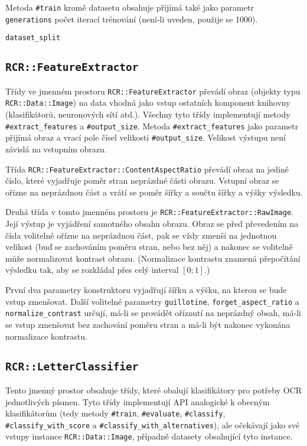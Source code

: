\documentclass[a4paper]{article}
\begin{document}
Metoda \texttt{\#train} kromě datasetu obsahuje přijímá také jako parametr
\texttt{generations} počet iterací trénování (není-li uveden, použije se 1000).

\texttt{dataset\_split}

\subsection{\texttt{RCR::FeatureExtractor}}
Třídy ve jmenném prostoru \texttt{RCR::FeatureExtractor} převádí obraz (objekty
typu \texttt{RCR::Data::Image}) na data vhodná jako vstup ostatních komponent
knihovny (klasifikátorů, neuronových sítí atd.).
Všechny tyto třídy implementují metody \texttt{\#extract\_features} a
\texttt{\#output\_size}. Metoda \texttt{\#extract\_features} jako parametr
přijímá obraz a vrací pole čísel velikosti \texttt{\#output\_size}.
Velikost výstupu není závislá na vstupním obrazu.


Třída \texttt{RCR::FeatureExtractor::ContentAspectRatio} převádí obraz na jediné
číslo, které vyjadřuje poměr stran neprázdné části obrazu. Vstupní obraz se
ořízne na neprázdnou část a vrátí se poměr šířky a součtu šířky a výšky výsledku.

Druhá třída v tomto jmenném prostoru je \texttt{RCR::FeatureExtractor::RawImage}.
Její výstup je vyjádření samotného obsahu obrazu. Obraz se před převedením na
čísla volitelně ořízne na neprázdnou část, pak se vždy zmenší na jednotnou velikost
(buď se zachováním poměru stran, nebo bez něj) a nakonec se volitelně může
normalizovat kontrast obrazu. (Normalizace kontrastu znamená přepočítání
výsledku tak, aby se rozkládal přes celý interval $[0;1]$.)

První dva parametry konstruktoru vyjadřují šířku a výšku, na kterou se bude
vstup zmenšovat. Další volitelné parametry \texttt{guillotine},
\texttt{forget\_aspect\_ratio} a \texttt{normalize\_contrast} určují, má-li
se provádět oříznutí na neprázdný obsah, má-li se vstup zmenšovat bez zachování
poměru stran a má-li být nakonec vykonána normalizace kontrastu.

\subsection{\texttt{RCR::LetterClassifier}}
Tento jmenný prostor obsahuje třídy, které obalují klasifikátory pro potřeby
OCR jednotlivých písmen. Tyto třídy implementují API analogické k obecným
klasifikátorům (tedy metody \texttt{\#train}, \texttt{\#evaluate}, \texttt{\#classify},
\texttt{\#classify\_with\_score} a \texttt{\#classify\_with\_alternatives}),
ale očekávají jako své vstupy instance \texttt{RCR::Data::Image}, případně
datasety obsahující tyto instance.
\end{document}
